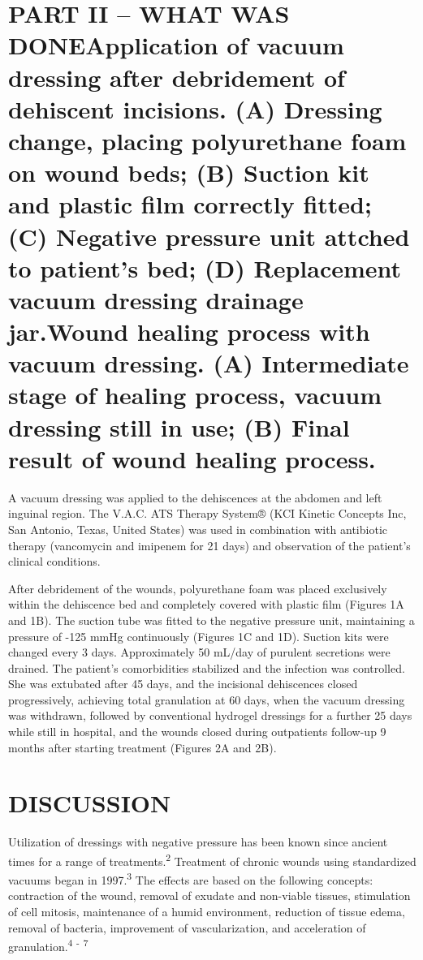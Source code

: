 \documentclass[numberinsection,times,10pt,spreadimages]{memoir}
\begin{document}
\section{PART II – WHAT WAS DONEApplication of vacuum dressing after debridement
of dehiscent
incisions. (A) Dressing change, placing polyurethane foam on wound beds;
(B) Suction kit and plastic film correctly fitted; (C) Negative pressure
unit attched to patient’s bed; (D) Replacement vacuum dressing drainage
jar.Wound healing process with vacuum dressing. (A) Intermediate stage of
healing process, vacuum dressing still in use; (B) Final result of wound
healing process.}

A vacuum dressing was applied to the dehiscences at the abdomen and left
inguinal
region. The V.A.C. ATS Therapy System® (KCI Kinetic Concepts Inc, San Antonio,
Texas, United States) was used in combination with antibiotic therapy
(vancomycin and imipenem for 21 days) and observation of the patient’s clinical
conditions.

After debridement of the wounds, polyurethane foam was placed exclusively within
the dehiscence bed and completely covered with plastic film (Figures 1A and 1B).
The suction tube was fitted to the negative
pressure unit, maintaining a pressure of -125 mmHg continuously (Figures 1C and
1D). Suction kits were changed every 3 days.
Approximately 50 mL/day of purulent secretions were drained. The patient’s
comorbidities stabilized and the infection was controlled. She was extubated
after 45 days, and the incisional dehiscences closed progressively, achieving
total granulation at 60 days, when the vacuum dressing was withdrawn, followed
by conventional hydrogel dressings for a further 25 days while still in
hospital, and the wounds closed during outpatients follow-up 9 months after
starting treatment (Figures 2A and
2B).

\section{DISCUSSION}

Utilization of dressings with negative pressure has been known since ancient
times for a range of treatments.\textsuperscript{2}
Treatment of chronic wounds using standardized vacuums
began in 1997.\textsuperscript{3}
The effects
are based on the following concepts: contraction of the wound, removal of
exudate and non-viable tissues, stimulation of cell mitosis, maintenance of a
humid environment, reduction of tissue edema, removal of bacteria, improvement
of vascularization, and acceleration of granulation.\textsuperscript{4}
\textsuperscript{-}
\textsuperscript{7}
\end{document}
